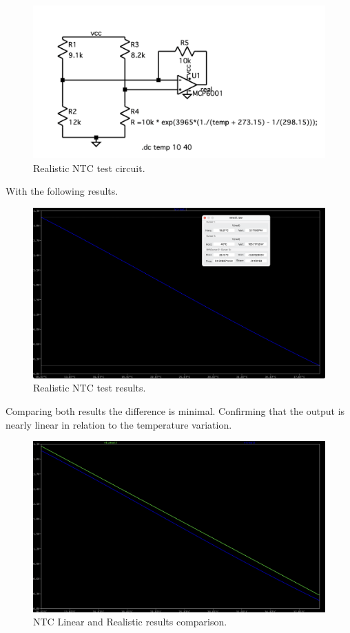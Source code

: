 \documentclass[12pt]{article}
\begin{document}
    \begin{figure}[H] 
        \centering
        \includegraphics*[scale = 0.6]{images/NTCRealTb.png}
        \caption{Realistic NTC test circuit.}
        \label{wrap-fig:1}
    \end{figure}
    
    With the following results.
    
    \begin{figure}[H] 
        \centering
        \includegraphics*[scale = 0.3]{images/NTCRealRes.png}
        \caption{Realistic NTC test results.}
        \label{wrap-fig:1}
    \end{figure}

    Comparing both results the difference is minimal. Confirming that the output is nearly linear in relation to the temperature variation.
    
    \begin{figure}[H] 
        \centering
        \includegraphics*[scale = 0.3]{images/NTCRealLinearComp.png}
        \caption{NTC Linear and Realistic results comparison.}
        \label{wrap-fig:1}
    \end{figure}
\end{document}
